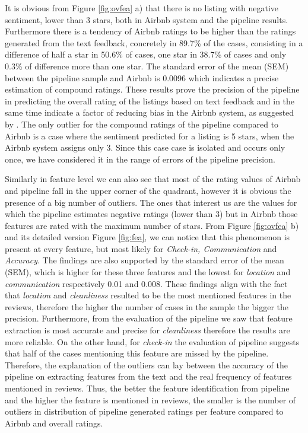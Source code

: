 It is obvious from Figure \ref{fig:ovfea} a) that there is no listing with negative sentiment, lower than 3 stars, both in Airbnb system and the pipeline results. Furthermore there is a tendency of Airbnb ratings to be higher than the ratings generated from the text feedback, concretely in 89.7\% of the cases, consisting in a difference of half a star in 50.6\% of cases, one star in 38.7\% of cases and only 0.3\% of difference more than one star. The standard error of the mean (SEM) between the pipeline sample and Airbnb is 0.0096 which indicates a precise estimation of compound ratings. These results prove the precision of the pipeline in predicting the overall rating of the listings based on text feedback and in the same time indicate a factor of reducing bias in the Airbnb system, as suggested by \cite{fradkin2016bias}. The only outlier for the compound ratings of the pipeline compared to Airbnb is a case where the sentiment predicted for a listing is 5 stars, when the Airbnb system assigns only 3. Since this case case is isolated and occurs only once, we have considered it in the range of errors of the pipeline precision. 

Similarly in feature level we can also see that most of the rating values of Airbnb and pipeline fall in the upper corner of the quadrant, however it is obvious the presence of a big number of outliers. The ones that interest us are the values for which the pipeline estimates negative ratings (lower than 3) but in Airbnb those features are rated with the maximum number of stars. From Figure \ref{fig:ovfea} b) and its detailed version Figure \ref{fig:fea}, we can notice that this phenomenon is present at every feature, but most likely for \textit{Check-in, Communication } and \textit{Accuracy}. The findings are also supported by the standard error of the mean (SEM), which is higher for these three features and the lowest for \textit{location} and \textit{communication} respectively 0.01 and 0.008. These findings align with the fact that \textit{location} and \textit{cleanliness} resulted to be the most mentioned features in the reviews, therefore the higher the number of cases in the sample the bigger the precision. Furthermore, from the evaluation of the pipeline we saw that feature extraction is most accurate and precise for \textit{cleanliness} therefore the results are more reliable. On the other hand, for \textit{check-in} the evaluation of pipeline suggests that half of the cases mentioning this feature are missed by the pipeline. Therefore, the explanation of the outliers can lay between the accuracy of the pipeline on extracting features from the text and the real frequency of features mentioned in reviews. Thus, the better the feature identification from pipeline and the higher the feature is mentioned in reviews, the smaller is the number of outliers in distribution of pipeline generated ratings per feature compared to Airbnb and overall ratings.

